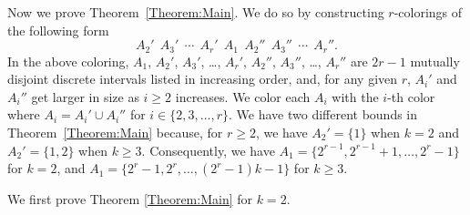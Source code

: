 \documentclass[11pt]{article}
\theoremstyle{definition}
\begin{document}
Now we prove Theorem~\ref{Theorem:Main}. We do so by constructing $r$-colorings of the following form
\[
A_2'\ \ A_3'\ \ \cdots\ \  A_r'\ \ A_1\ \ A_2''\ \ A_3''\ \ \cdots\ \ A_r''.
\]
In the above coloring, $A_1$, $A_2'$, $A_3'$, \ldots, $A_r'$, $A_2''$, $A_3''$, \ldots, $A_r''$ are $2r-1$ mutually disjoint discrete intervals listed in increasing order, and, for any given $r$, $A_i'$ and $A_i''$ get larger in size as $i\geq2$ increases. We color each $A_i$ with the $i$-th color where $A_i=A_i'\cup A_i''$ for $i\in\{2,3,\ldots,r\}$. We have two different bounds in Theorem~\ref{Theorem:Main} because, for $r\geq2$, we have $A_2'=\{1\}$ when $k=2$ and $A_2'=\{1,2\}$ when $k\geq3$. Consequently, we have $A_1=\{2^{r-1},2^{r-1}+1,\ldots,2^r-1\}$ for $k=2$, and $A_1=\{2^r-1,2^r,\ldots,(2^r-1)k-1\}$ for $k\geq3$.

We first prove Theorem \ref{Theorem:Main} for $k=2$.
\end{document}
